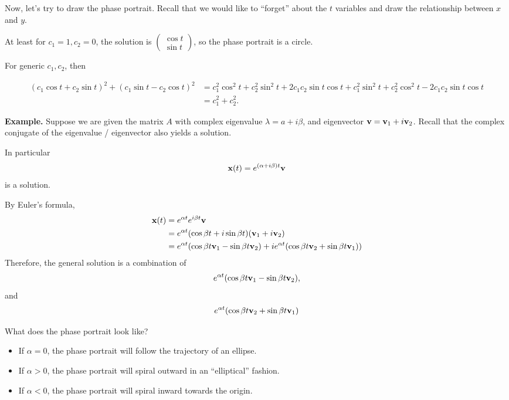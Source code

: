 \documentclass{article}
\newcommand{\mat}[1]{\begin{pmatrix}#1\end{pmatrix}}
\begin{document}
  Now, let's try to draw the phase portrait.  Recall that we would like to ``forget'' about the $t$ variables and draw the relationship between $x$ and $y$.

  At least for $c_1 = 1, c_2 = 0$, the solution is $\mat{\cos t \\ \sin t}$, so the phase portrait is a circle.

  For generic $c_1, c_2$, then

  \begin{align*}
    (c_1 \cos t + c_2 \sin t)^2 + (c_1 \sin t - c_2 \cos t)^2 &= c_1^2 \cos^2 t + c_2^2 \sin^2 t + 2 c_1 c_2 \sin t \cos t + c_1^2 \sin ^2 t + c_2^2 \cos^2 t - 2 c_1 c_2 \sin t \cos t \\
   & = c_1^2 + c_2^2.
  \end{align*}

  {\bf Example.} Suppose we are given the matrix $A$ with complex eigenvalue $\lambda = a + i \beta$, and eigenvector $\mathbf{v} = \mathbf{v}_1 + i \mathbf{v}_2$.  Recall that the complex conjugate of the eigenvalue / eigenvector also yields a solution.

  In particular
  \begin{align*}
    \mathbf{x}(t) = e^{(\alpha + i \beta) t} \mathbf{v}
  \end{align*}
  is a solution.

  By Euler's formula,
  \begin{align*}
    \mathbf{x}(t) &= e^{\alpha t} e^{i \beta t} \mathbf{v} \\
    &= e^{\alpha t} (\cos \beta t + i \sin \beta t) (\mathbf{v}_1 + i \mathbf{v}_2) \\
&= e^{\alpha t} (\cos \beta t \mathbf{v}_1 - \sin \beta t \mathbf{v}_2) + i e^{\alpha t} (\cos \beta t \mathbf{v}_2 + \sin \beta t \mathbf{v}_1))
  \end{align*}
  Therefore, the general solution is a combination of
  \begin{align*}
    e^{\alpha t} (\cos \beta t \mathbf{v}_1 - \sin \beta t \mathbf{v}_2),
  \end{align*}
  and
  \begin{align*}
    e^{\alpha t} (\cos \beta t \mathbf{v}_2 +  \sin \beta t \mathbf{v}_1)
  \end{align*}

  What does the phase portrait look like?

  \begin{itemize}
    \item If $\alpha = 0$, the phase portrait will follow the trajectory of an ellipse.
    \item If $\alpha > 0$, the phase portrait will spiral outward in an ``elliptical'' fashion.
    \item If $\alpha < 0$, the phase portrait will spiral inward towards the origin.
  \end{itemize}
\end{document}
